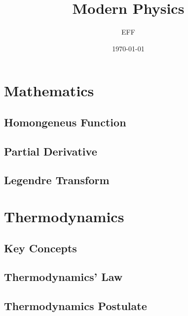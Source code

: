 \documentclass[10pt]{report}
\title{Modern Physics}
\author{EFF}
\date{\today}
\begin{document}
\pagestyle{empty}

\nocite{Boas2005}\nocite{Faisca2022}\nocite{Puri2024}\nocite{Serway2014}

\chapter*{Mathematics}
\section*{Homongeneus Function}
\clearpage

\section*{Partial Derivative}
\clearpage

\section*{Legendre Transform}


\chapter*{Thermodynamics}

\section*{Key Concepts}
\clearpage

\section*{Thermodynamics' Law}
\clearpage

\section*{Thermodynamics Postulate}


\printbibliography
\end{document}
